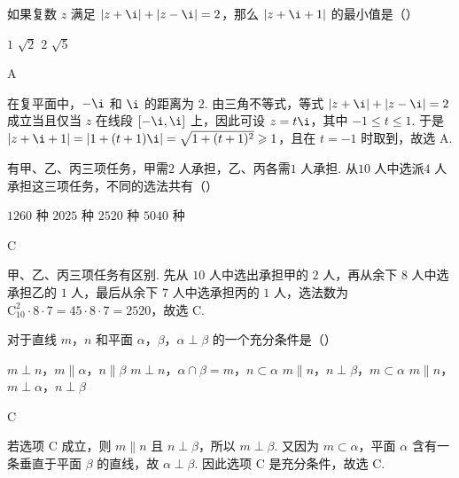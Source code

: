 \begin{problem}
如果复数 \(z\) 满足 \(|z + \i| + |z - \i| = 2\)，那么 \(|z + \i + 1|\) 的最小值是（\quad）

\choices
    {\(1\)}
    {\(\sqrt{2}\)}
    {\(2\)}
    {\(\sqrt{5}\)}
\end{problem}

\begin{answer}
A
\end{answer}

\begin{solution}
在复平面中，\(-\i\) 和 \(\i\) 的距离为 \(2\). 由三角不等式，等式 \(|z+\i|+|z-\i|=2\) 成立当且仅当 \(z\) 在线段 \([-\i,\i]\) 上，因此可设 \(z=t\i\)，其中 \(-1\leqslant t\leqslant1\). 于是
\(|z+\i+1|=|1+(t+1)\i|=\sqrt{1+(t+1)^2}\geqslant1\)，且在 \(t=-1\) 时取到，故选 A.
\end{solution}

\begin{problem}
有甲、乙、丙三项任务，甲需\(2\) 人承担，乙、丙各需\(1\) 人承担. 从\(10\) 人中选派\(4\) 人承担这三项任务，不同的选法共有（\quad）

\choices
    {\(1260\text{ 种}\)}
    {\(2025\text{ 种}\)}
    {\(2520\text{ 种}\)}
    {\(5040\text{ 种}\)}
\end{problem}

\begin{answer}
C
\end{answer}

\begin{solution}
甲、乙、丙三项任务有区别. 先从 \(10\) 人中选出承担甲的 \(2\) 人，再从余下 \(8\) 人中选承担乙的 \(1\) 人，最后从余下 \(7\) 人中选承担丙的 \(1\) 人，选法数为 \(\mathrm C_{10}^{2}\cdot8\cdot7=45\cdot8\cdot7=2520\)，故选 C.
\end{solution}

\begin{problem}
对于直线 \(m\)，\(n\) 和平面 \(\alpha\)，\(\beta\)，\(\alpha \perp \beta\) 的一个充分条件是（\quad）

\choices
    {\(m \perp n\)，\(m \parallel \alpha\)，\(n \parallel \beta\)}
    {\(m \perp n\)，\(\alpha \cap \beta = m\)，\(n \subset \alpha\)}
    {\(m \parallel n\)，\(n \perp \beta\)，\(m \subset \alpha\)}
    {\(m \parallel n\)，\(m \perp \alpha\)，\(n \perp \beta\)}
\end{problem}

\begin{answer}
C
\end{answer}

\begin{solution}
若选项 C 成立，则 \(m\parallel n\) 且 \(n\perp\beta\)，所以 \(m\perp\beta\). 又因为 \(m\subset\alpha\)，平面 \(\alpha\) 含有一条垂直于平面 \(\beta\) 的直线，故 \(\alpha\perp\beta\). 因此选项 C 是充分条件，故选 C.
\end{solution}

